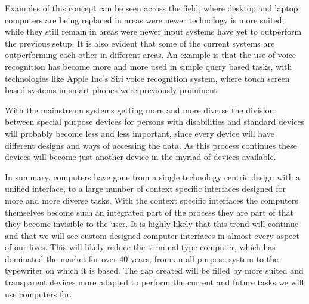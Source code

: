 Examples of this concept can be seen across the field, where desktop and laptop computers are being replaced in areas were newer technology is more suited, while they still remain in areas were newer input systems have yet to outperform the previous setup. It is also evident that some of the current systems are outperforming each other in different areas. An example is that the use of voice recognition has become more and more used in simple query based tasks, with technologies like Apple Inc's Siri voice recognition system, where touch screen based systems in smart phones were previously prominent.

With the mainstream systems getting more and more diverse the division between special purpose devices for persons with disabilities and standard devices will probably become less and less important, since every device will have different designs and ways of accessing the data. As this process continues these devices will become just another device in the myriad of devices available. 

In summary, computers have gone from a single technology centric design with a unified interface, to a large number of context specific interfaces designed for more and more diverse tasks. With the context specific interfaces the computers themselves become such an integrated part of the process they are part of that they become invisible to the user. It is highly likely that this trend will continue and that we will see custom designed computer interfaces in almost every aspect of our lives. This will likely reduce the terminal type computer, which has dominated the market for over 40 years, from an all-purpose system to the typewriter on which it is based. The gap created will be filled by more suited and transparent devices more adapted to perform the current and future tasks we will use computers for.